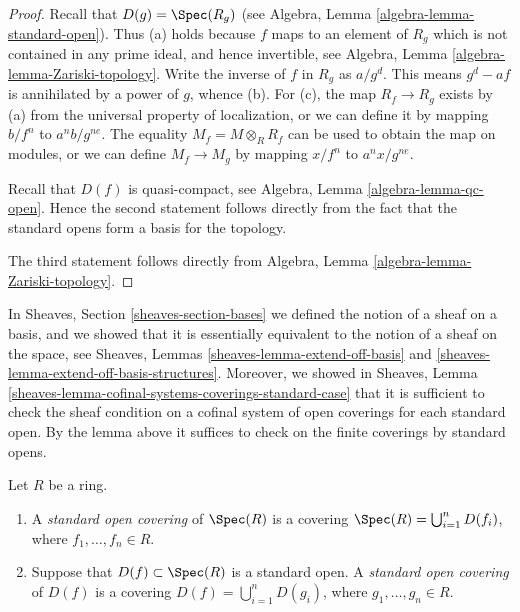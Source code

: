 \begin{proof}
Recall that $D(g) = \Spec(R_g)$ (see
Algebra, Lemma \ref{algebra-lemma-standard-open}).
Thus (a) holds because $f$
maps to an element of $R_g$ which is not
contained in any prime ideal, and hence invertible,
see Algebra, Lemma \ref{algebra-lemma-Zariski-topology}.
Write the inverse of $f$ in $R_g$ as $a/g^d$.
This means $g^d - af$ is annihilated by a power of $g$, whence (b).
For (c), the map $R_f \to R_g$ exists by (a) from the universal property
of localization, or we can define it by mapping $b/f^n$
to $a^nb/g^{ne}$. The equality $M_f = M \otimes_R R_f$
can be used to obtain the map on modules, or
we can define $M_f \to M_g$ by mapping
$x/f^n$ to $a^nx/g^{ne}$.

\medskip\noindent
Recall that $D(f)$ is quasi-compact, see
Algebra, Lemma \ref{algebra-lemma-qc-open}.
Hence the second statement follows directly
from the fact that the standard opens form
a basis for the topology.

\medskip\noindent
The third statement follows directly from
Algebra, Lemma \ref{algebra-lemma-Zariski-topology}.
\end{proof}

\noindent
In Sheaves, Section \ref{sheaves-section-bases} we defined
the notion of a sheaf on a basis, and we showed that it is
essentially equivalent to the notion of a sheaf on the space,
see Sheaves, Lemmas \ref{sheaves-lemma-extend-off-basis} and
\ref{sheaves-lemma-extend-off-basis-structures}. Moreover,
we showed in
Sheaves, Lemma \ref{sheaves-lemma-cofinal-systems-coverings-standard-case}
that it is sufficient to check the sheaf
condition on a cofinal system of open coverings for each
standard open. By the lemma above it suffices to check
on the finite coverings by standard opens.

\begin{definition}
\label{definition-standard-covering}
Let $R$ be a ring.
\begin{enumerate}
\item A {\it standard open covering} of $\Spec(R)$
is a covering $\Spec(R) = \bigcup_{i = 1}^n D(f_i)$,
where $f_1, \ldots, f_n \in R$.
\item Suppose that $D(f) \subset \Spec(R)$ is a standard
open. A {\it standard open covering} of $D(f)$
is a covering $D(f) = \bigcup_{i = 1}^n D(g_i)$,
where $g_1, \ldots, g_n \in R$.
\end{enumerate}
\end{definition}

